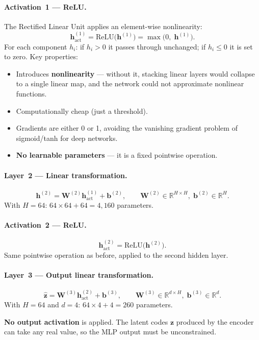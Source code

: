 \documentclass[11pt,a4paper]{article}
\newcommand{\R}{\mathbb{R}}
\newcommand{\bz}{\mathbf{z}}
\newcommand{\bW}{\mathbf{W}}
\newcommand{\bb}{\mathbf{b}}
\newcommand{\bh}{\mathbf{h}}
\begin{document}
\paragraph{Activation~1 --- ReLU.}
The Rectified Linear Unit applies an element-wise nonlinearity:
\[
  \bh^{(1)}_{\text{act}} = \mathrm{ReLU}\!\bigl(\bh^{(1)}\bigr)
  = \max\!\bigl(0,\;\bh^{(1)}\bigr).
\]
For each component $h_i$: if $h_i > 0$ it passes through unchanged;
if $h_i \le 0$ it is set to zero.  Key properties:
\begin{itemize}[leftmargin=2em]
  \item Introduces \textbf{nonlinearity} --- without it, stacking
    linear layers would collapse to a single linear map, and the
    network could not approximate nonlinear functions.
  \item Computationally cheap (just a threshold).
  \item Gradients are either 0 or 1, avoiding the vanishing gradient
    problem of sigmoid/tanh for deep networks.
  \item \textbf{No learnable parameters} --- it is a fixed pointwise
    operation.
\end{itemize}

\paragraph{Layer~2 --- Linear transformation.}
\[
  \bh^{(2)} = \bW^{(2)} \bh^{(1)}_{\text{act}} + \bb^{(2)}
  ,\qquad
  \bW^{(2)} \in \R^{H \times H},\;
  \bb^{(2)} \in \R^{H}.
\]
With $H=64$: $64\times64 + 64 = 4{,}160$ parameters.

\paragraph{Activation~2 --- ReLU.}
\[
  \bh^{(2)}_{\text{act}} = \mathrm{ReLU}\!\bigl(\bh^{(2)}\bigr).
\]
Same pointwise operation as before, applied to the second hidden layer.

\paragraph{Layer~3 --- Output linear transformation.}
\[
  \hat{\bz} = \bW^{(3)} \bh^{(2)}_{\text{act}} + \bb^{(3)}
  ,\qquad
  \bW^{(3)} \in \R^{d \times H},\;
  \bb^{(3)} \in \R^{d}.
\]
With $H=64$ and $d=4$: $64\times4 + 4 = 260$ parameters.

\textbf{No output activation} is applied.  The latent codes $\bz$
produced by the encoder can take any real value, so the MLP output
must be unconstrained.
\end{document}
